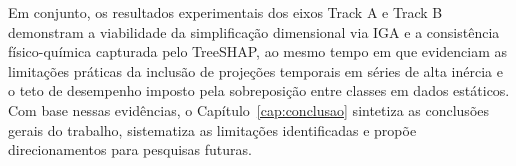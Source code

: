 Em conjunto, os resultados experimentais dos eixos Track A e Track B demonstram a viabilidade da simplificação dimensional via IGA e a consistência físico-química capturada pelo TreeSHAP, ao mesmo tempo em que evidenciam as limitações práticas da inclusão de projeções temporais em séries de alta inércia e o teto de desempenho imposto pela sobreposição entre classes em dados estáticos. Com base nessas evidências, o Capítulo~\ref{cap:conclusao} sintetiza as conclusões gerais do trabalho, sistematiza as limitações identificadas e propõe direcionamentos para pesquisas futuras.
